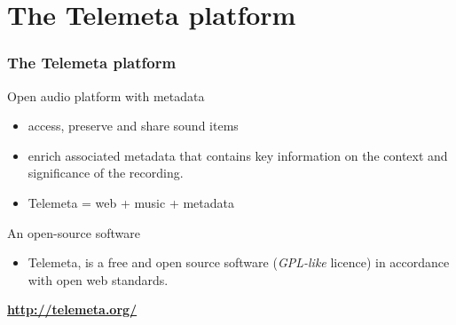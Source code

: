 \documentclass[final, hyperref, table]{beamer}
\begin{document}
\section[Telemeta]{The Telemeta platform}\label{sec:Telemeta}

\begin{frame}
  \frametitle{The Telemeta platform}
  \begin{block}{Open audio platform with metadata}
      \begin{itemize}
      \item \alert{access, preserve} and \alert{share} sound items
      \item enrich associated \alert{metadata} that
        contains key information on the context and significance of
        the recording.
      \item Telemeta = web + music + metadata
      \end{itemize}
   
    
  \end{block}
  \begin{block}{An open-source software}
    \begin{itemize}
    \item Telemeta, is a \alert{free and open source software} (\emph{GPL-like} licence)
       in accordance with \alert{open web standards}.
    \end{itemize}
    \vspace{-0.5cm}
    \begin{center}
\hspace{1cm}
      \colorbox{yellow!40}{\textbf{\url{http://telemeta.org/}}}
    \end{center}
  \end{block}
\end{frame}
\end{document}
